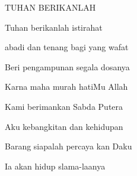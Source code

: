 TUHAN BERIKANLAH 

Tuhan berikanlah istirahat 

abadi dan tenang bagi yang wafat 

Beri pengampunan segala dosanya 

Karna maha murah hatiMu Allah 

Kami berimankan Sabda Putera 

Aku kebangkitan dan kehidupan 

Barang siapalah percaya kan Daku 

Ia akan hidup slama-laanya
